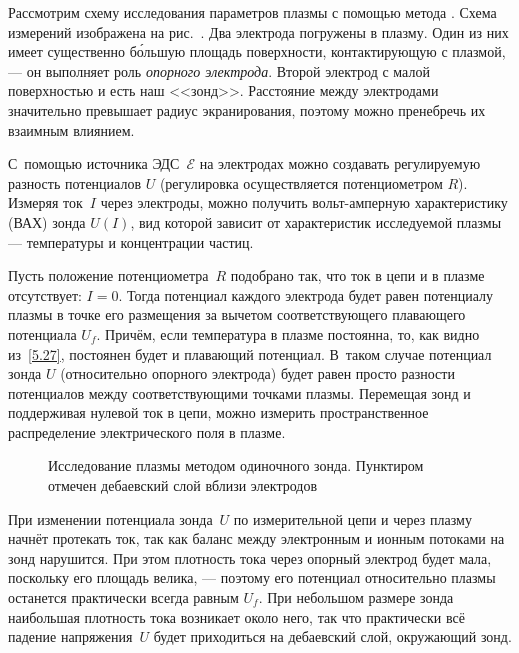 
Рассмотрим схему исследования параметров плазмы с помощью метода
.
Схема измерений изображена на рис.~. 
Два электрода погружены в плазму.
Один из них имеет существенно б\'{о}льшую 
площадь поверхности, контактирующую с плазмой,
--- он выполняет роль \emph{опорного электрода}.
Второй электрод с малой поверхностью и есть наш <<зонд>>.
Расстояние между электродами значительно превышает радиус экранирования,
поэтому можно пренебречь их взаимным влиянием. 

С~помощью источника ЭДС~$\mathcal{E}$ на электродах 
можно создавать регулируемую разность потенциалов $U$
(регулировка осуществляется потенциометром $R$).
Измеряя ток~$I$ через электроды, можно получить 
вольт-амперную характеристику (ВАХ) зонда $U(I)$,
вид которой зависит от характеристик исследуемой плазмы ---
температуры и концентрации частиц.


Пусть положение потенциометра~$R$ подобрано так, что
ток в цепи и в плазме отсутствует: $I=0$.
Тогда потенциал каждого электрода будет равен потенциалу плазмы 
в точке его размещения за вычетом соответствующего плавающего потенциала $U_f$.
Причём, если температура в плазме постоянна, то, как видно из~\eqref{5.27},
постоянен будет и плавающий потенциал. В~таком случае потенциал зонда $U$ 
(относительно опорного электрода) будет равен просто разности потенциалов 
между соответствующими точками плазмы. Перемещая зонд
и поддерживая нулевой ток в цепи, можно измерить 
пространственное распределение электрического поля в плазме.

\begin{figure}[h!]
    \centering
    {    \small
    }
    \caption{Исследование плазмы методом одиночного зонда. Пунктиром
        отмечен дебаевский слой вблизи электродов}
\end{figure}

При изменении потенциала зонда~$U$ по измерительной цепи и через плазму
начнёт протекать ток, так как баланс между электронным и ионным потоками 
на зонд нарушится. 
При этом плотность тока через опорный электрод будет мала,
поскольку его площадь велика, --- поэтому его потенциал относительно плазмы
останется практически всегда равным $U_f$. При небольшом размере зонда наибольшая
плотность тока возникает около него, так что практически всё падение 
напряжения~$U$ будет приходиться на дебаевский слой, окружающий зонд.
 
